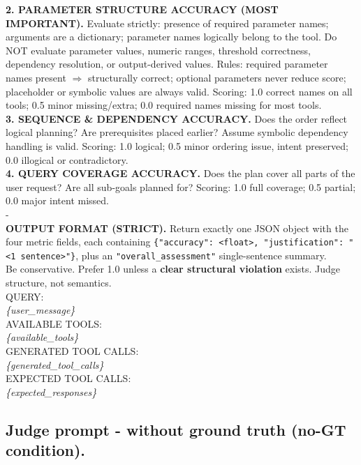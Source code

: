 \begin{promptbox}
\textbf{2. PARAMETER STRUCTURE ACCURACY (MOST IMPORTANT).} Evaluate strictly: presence of required parameter names; arguments are a dictionary; parameter names logically belong to the tool. Do NOT evaluate parameter values, numeric ranges, threshold correctness, dependency resolution, or output-derived values. Rules: required parameter names present $\Rightarrow$ structurally correct; optional parameters never reduce score; placeholder or symbolic values are always valid. Scoring: 1.0 correct names on all tools; 0.5 minor missing/extra; 0.0 required names missing for most tools.\\[3pt]
\textbf{3. SEQUENCE \& DEPENDENCY ACCURACY.} Does the order reflect logical planning? Are prerequisites placed earlier? Assume symbolic dependency handling is valid. Scoring: 1.0 logical; 0.5 minor ordering issue, intent preserved; 0.0 illogical or contradictory.\\[3pt]
\textbf{4. QUERY COVERAGE ACCURACY.} Does the plan cover all parts of the user request? Are all sub-goals planned for? Scoring: 1.0 full coverage; 0.5 partial; 0.0 major intent missed.\\[4pt]
-\\
\textbf{OUTPUT FORMAT (STRICT).} Return exactly one JSON object with the four metric fields, each containing \texttt{\{"accuracy": <float>, "justification": "<1 sentence>"\}}, plus an \texttt{"overall\_assessment"} single-sentence summary.\\[4pt]
Be conservative. Prefer 1.0 unless a \textbf{clear structural violation} exists. Judge structure, not semantics.\\[6pt]
QUERY:\\
\textit{\{user\_message\}}\\[4pt]
AVAILABLE TOOLS:\\
\textit{\{available\_tools\}}\\[4pt]
GENERATED TOOL CALLS:\\
\textit{\{generated\_tool\_calls\}}\\[4pt]
EXPECTED TOOL CALLS:\\
\textit{\{expected\_responses\}}
\end{promptbox}

\subsection{Judge prompt - without ground truth (no-GT condition).}
\label{app:prompt-no-gt}

